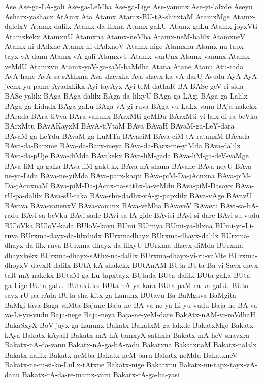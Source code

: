 {Ase
Ase-ga-LA-gali
Ase-ga-LeMba
Ase-ga-Lige
Ase-yanunx
Ase-yi-lalxde
Aseyu
Asharx-yashacx
AtAmx
Ata
Atamx
Atamx-BU-tA-shirxtaM
AtamxMge
Atamx-dalelxV
Atamx-dalilx
Atamx-da-lilxna
Atamx-gaLU
Atamx-gaLu
Atamx-joyxVti
Atamxkekx
AtamxnU
Atamxna
Atamx-neMba
Atamx-neM-balilx
AtamxneV
Atamx-ni-dAdxne
Atamx-ni-dAdxnoV
Atamx-nige
Atamxnu
Atamx-nu-tapx-tayx-vA-danu
Atamx-vA-gali
AtamxvU
Atamx-vanUnx
Atamx-vanunx
Atamx-veMdU
Atamxvu
Atamx-yoV-ga-saM-baMdha
Atana
Atane
Atanu
Atu-rada
AvA-hane
AvA-sa-sAthxna
Ava-shayxka
Ava-shayx-ka-vA-darU
Avudu
AyA
AyA-jecnx-yu-pame
Ayadxkikx
Ayi-tayAyx
Ayi-teM-dathaR
BA
BASe-geV-ri-sida
BASe-yalilx
BAga
BAga-dalilx
BAga-da-lilxyU
BAga-ga-LAgi
BAga-ga-Lalilx
BAga-ga-Lidudx
BAga-gaLu
BAga-vA-gi-ruva
BAga-vu-LaLx-vanu
BAja-nakekx
BArada
BAra-tiVya
BAra-vanunx
BArxMti-goMDu
BArxMti-yi-lalx-di-ra-beVku
BArxMtu
BAvAKayxM
BAvA-tiVtaM
BAva
BAvaH
BAvaM-ga-LeY-dara
BAvaM-ga-LeYdu
BAvaM-ga-LuMTu
BAvaciM
BAva-ciM-tA-ratanxM
BAvada
BAva-da-Barxme
BAva-da-Barx-meya
BAva-da-Barx-me-yiMda
BAva-dalilx
BAva-da-pUje
BAva-diMda
BAvakekx
BAva-liM-gada
BAva-liM-ga-deV-vaMge
BAva-liM-ga-gaLa
BAva-liM-gakUkx
BAva-nA-shana
BAvane
BAva-neyU
BAva-ne-ya-Lidu
BAva-ne-yiMda
BAva-parx-kaqti
BAva-piM-Da-jAcnxna
BAva-piM-Da-jAcnxnaM
BAva-piM-Da-jAcnx-na-sathx-la-veMdu
BAva-piM-Dasayx
BAva-rU-pa-dalilx
BAva-sU-taka
BAva-shu-dadhx-vA-gi-papxlilx
BAva-vAge
BAvavU
BAvava
BAva-vanenxV
BAva-vanunx
BAva-veMba
BAvaveV
BAvavu
BAvi-sa-bA-radu
BAvi-sa-beVku
BAvi-sade
BAvi-sa-lA-gide
BAvisi
BAvi-si-dare
BAvi-su-vudu
BUloVka
BUloV-kada
BUloV-kavu
BUmi
BUmiya
BUmi-ya-lilxna
BUmi-yo-Li-ruva
BUrxma-dayx-da-lilxdudx
BUrxmadhayx
BUrxma-dhayx-dalilx
BUrxma-dhayx-da-lilx-ruva
BUrxma-dhayx-da-lilxyU
BUrxma-dhayx-diMda
BUrxma-dhayxkekx
BUrxma-dhayx-sAthx-na-dalilx
BUrxma-dhayx-vi-ru-vaMte
BUrxma-dhoyxV-davxR-dalilx
BUtA-kA-shakekx
BUtAnAM
BUta
BUta-Ba-vi-Sayx-davx-taR-mA-nakekx
BUtaM-ga-Lu-tapxtayx
BUtada
BUta-dalilx
BUta-gaLa
BUta-ga-Lige
BUta-gaLu
BUtakUkx
BUta-nA-ya-kara
BUta-paM-ca-ka-gaLU
BUta-savx-rU-pa-rAda
BUta-sha-kitx-ga-Lanunx
BUtavu
Ba
BaMgava
BaMgita
BaMgi-tava
Baga-vaMta
Bajane
Baja-ne-BA-va-ne-ya-Li-yu-vudu
Baja-ne-BA-va-va-Li-yu-vudu
Baja-nege
Baja-neya
Baja-ne-yeM-dare
BakAtx-nAM-vi-roVdhaH
BakaSxyX-BoV-jayx-ga-Lanunx
Bakatx
BakatxM-ga-lalxde
BakatxMge
Bakatx-kAya
Bakatx-kAyaH
Bakatx-mA-hA-tamxyX-sathxla
Bakatx-mA-heV-shavxra
Bakatx-nA-da-vanu
Bakatx-nA-ga-bA-radu
Bakatxna
BakatxnaM
Bakatx-nalalx
Bakatx-nalilx
Bakatx-neMba
Bakatx-neM-baru
Bakatx-neMdu
BakatxneV
Bakatx-ne-ni-si-ko-LuLx-tAtxne
Bakatx-nige
Bakatxnu
Bakatx-nu-tapx-tayx-vA-danu
Bakatx-rA-da-re-mamx-varu
Bakatx-rA-ga-ba-yasi
}
